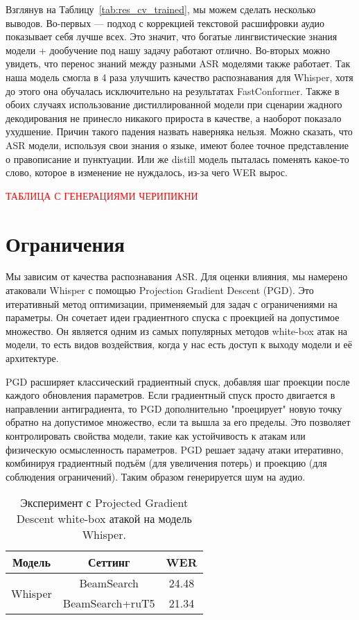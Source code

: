 Взглянув на Таблицу~\ref{tab:res_cv_trained}, мы можем сделать несколько выводов.
Во-первых — подход с коррекцией текстовой расшифровки аудио показывает себя лучше всех.
Это значит, что богатые лингвистические знания модели + дообучение под нашу задачу работают отлично.
Во-вторых можно увидеть, что перенос знаний между разными ASR моделями также работает.
Так наша модель смогла в 4 раза улучшить качество распознавания для Whisper, хотя до этого она обучалась исключительно на результатах FastConformer.
Также в обоих случаях использование дистиллированной модели при сценарии жадного декодирования не принесло никакого прироста в качестве, а наоборот показало ухудшение. Причин такого падения назвать наверняка нельзя.
Можно сказать, что ASR модели, используя свои знания о языке, имеют более точное представление о правописание и пунктуации.
Или же distill модель пыталась поменять какое-то слово, которое в изменение не нуждалось, из-за чего WER вырос.

\textcolor{red}{ТАБЛИЦА С ГЕНЕРАЦИЯМИ ЧЕРИПИКНИ}

\section{Ограничения}

Мы зависим от качества распознавания ASR.
Для оценки влияния, мы намерено атаковали Whisper с помощью Projection Gradient Descent (PGD).
Это итеративный метод оптимизации, применяемый для задач с ограничениями на параметры.
Он сочетает идеи градиентного спуска с проекцией на допустимое множество.
Он является одним из самых популярных методов white-box атак на модели, то есть видов воздействия, когда у нас есть доступ к выходу модели и её архитектуре.

PGD расширяет классический градиентный спуск, добавляя шаг проекции после каждого обновления параметров.
Если градиентный спуск просто двигается в направлении антиградиента, то PGD дополнительно "проецирует" новую точку обратно на допустимое множество, если та вышла за его пределы. Это позволяет контролировать свойства модели, такие как устойчивость к атакам или физическую осмысленность параметров.
PGD решает задачу атаки итеративно, комбинируя градиентный подъём (для увеличения потерь) и проекцию (для соблюдения ограничений).
Таким образом генерируется шум на аудио.

\begin{table}[]
\centering
\caption{Эксперимент с Projected Gradient Descent white-box атакой на модель Whisper.}
\begin{tabular}{|c|c|c|}
\hline
Модель                         & Сеттинг                              & WER     \\ \hline
\multirow{2}{*}{Whisper}       & BeamSearch                           & 24.48   \\ \cline{2-3} 
                               & BeamSearch+ruT5                      & 21.34   \\ \hline
\end{tabular}
\label{tab:pgd}
\end{table}

